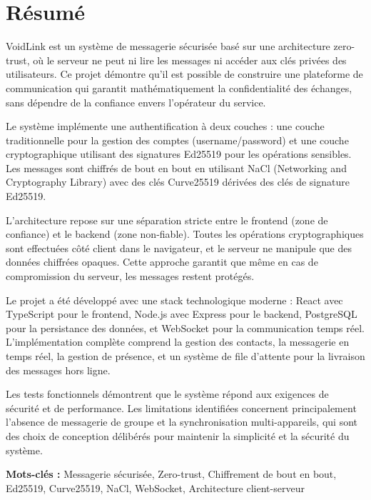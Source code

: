 \chapter*{Résumé}

VoidLink est un système de messagerie sécurisée basé sur une architecture zero-trust, où le serveur ne peut ni lire les messages ni accéder aux clés privées des utilisateurs. Ce projet démontre qu'il est possible de construire une plateforme de communication qui garantit mathématiquement la confidentialité des échanges, sans dépendre de la confiance envers l'opérateur du service.

Le système implémente une authentification à deux couches : une couche traditionnelle pour la gestion des comptes (username/password) et une couche cryptographique utilisant des signatures Ed25519 pour les opérations sensibles. Les messages sont chiffrés de bout en bout en utilisant NaCl (Networking and Cryptography Library) avec des clés Curve25519 dérivées des clés de signature Ed25519.

L'architecture repose sur une séparation stricte entre le frontend (zone de confiance) et le backend (zone non-fiable). Toutes les opérations cryptographiques sont effectuées côté client dans le navigateur, et le serveur ne manipule que des données chiffrées opaques. Cette approche garantit que même en cas de compromission du serveur, les messages restent protégés.

Le projet a été développé avec une stack technologique moderne : React avec TypeScript pour le frontend, Node.js avec Express pour le backend, PostgreSQL pour la persistance des données, et WebSocket pour la communication temps réel. L'implémentation complète comprend la gestion des contacts, la messagerie en temps réel, la gestion de présence, et un système de file d'attente pour la livraison des messages hors ligne.

Les tests fonctionnels démontrent que le système répond aux exigences de sécurité et de performance. Les limitations identifiées concernent principalement l'absence de messagerie de groupe et la synchronisation multi-appareils, qui sont des choix de conception délibérés pour maintenir la simplicité et la sécurité du système.

\textbf{Mots-clés :} Messagerie sécurisée, Zero-trust, Chiffrement de bout en bout, Ed25519, Curve25519, NaCl, WebSocket, Architecture client-serveur

